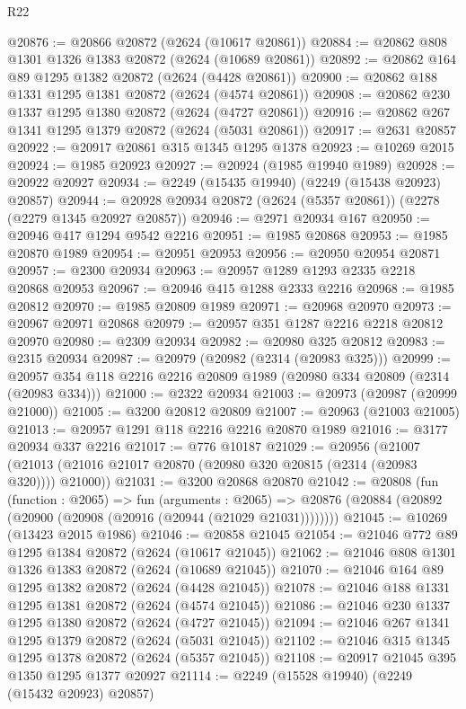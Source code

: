 \begin{lexlean}{R22}
\begin{coremodule}
@20876 := @20866 @20872 (@2624 (@10617 @20861))
@20884 := @20862 @808 @1301 @1326 @1383 @20872 (@2624 (@10689 @20861))
@20892 := @20862 @164 @89 @1295 @1382 @20872 (@2624 (@4428 @20861))
@20900 := @20862 @188 @1331 @1295 @1381 @20872 (@2624 (@4574 @20861))
@20908 := @20862 @230 @1337 @1295 @1380 @20872 (@2624 (@4727 @20861))
@20916 := @20862 @267 @1341 @1295 @1379 @20872 (@2624 (@5031 @20861))
@20917 := @2631 @20857
@20922 := @20917 @20861 @315 @1345 @1295 @1378
@20923 := @10269 @2015
@20924 := @1985 @20923
@20927 := @20924 (@1985 @19940 @1989)
@20928 := @20922 @20927
@20934 := @2249 (@15435 @19940) (@2249 (@15438 @20923) @20857)
@20944 := @20928 @20934 @20872 (@2624 (@5357 @20861)) (@2278 (@2279 @1345 @20927 @20857))
@20946 := @2971 @20934 @167
@20950 := @20946 @417 @1294 @9542 @2216
@20951 := @1985 @20868
@20953 := @1985 @20870 @1989
@20954 := @20951 @20953
@20956 := @20950 @20954 @20871
@20957 := @2300 @20934
@20963 := @20957 @1289 @1293 @2335 @2218 @20868 @20953
@20967 := @20946 @415 @1288 @2333 @2216
@20968 := @1985 @20812
@20970 := @1985 @20809 @1989
@20971 := @20968 @20970
@20973 := @20967 @20971 @20868
@20979 := @20957 @351 @1287 @2216 @2218 @20812 @20970
@20980 := @2309 @20934
@20982 := @20980 @325 @20812
@20983 := @2315 @20934
@20987 := @20979 (@20982 (@2314 (@20983 @325)))
@20999 := @20957 @354 @118 @2216 @2216 @20809 @1989 (@20980 @334 @20809 (@2314 (@20983 @334)))
@21000 := @2322 @20934
@21003 := @20973 (@20987 (@20999 @21000))
@21005 := @3200 @20812 @20809
@21007 := @20963 (@21003 @21005)
@21013 := @20957 @1291 @118 @2216 @2216 @20870 @1989
@21016 := @3177 @20934 @337 @2216
@21017 := @776 @10187
@21029 := @20956
    (@21007 (@21013 (@21016 @21017 @20870 (@20980 @320 @20815 (@2314 (@20983 @320)))) @21000))
@21031 := @3200 @20868 @20870
@21042 := @20808
    (fun (function : @2065) =>
    fun (arguments : @2065) =>
    @20876 (@20884 (@20892 (@20900 (@20908 (@20916 (@20944 (@21029 @21031))))))))
@21045 := @10269 (@13423 @2015 @1986)
@21046 := @20858 @21045
@21054 := @21046 @772 @89 @1295 @1384 @20872 (@2624 (@10617 @21045))
@21062 := @21046 @808 @1301 @1326 @1383 @20872 (@2624 (@10689 @21045))
@21070 := @21046 @164 @89 @1295 @1382 @20872 (@2624 (@4428 @21045))
@21078 := @21046 @188 @1331 @1295 @1381 @20872 (@2624 (@4574 @21045))
@21086 := @21046 @230 @1337 @1295 @1380 @20872 (@2624 (@4727 @21045))
@21094 := @21046 @267 @1341 @1295 @1379 @20872 (@2624 (@5031 @21045))
@21102 := @21046 @315 @1345 @1295 @1378 @20872 (@2624 (@5357 @21045))
@21108 := @20917 @21045 @395 @1350 @1295 @1377 @20927
@21114 := @2249 (@15528 @19940) (@2249 (@15432 @20923) @20857)

\end{coremodule}
\end{lexlean}
